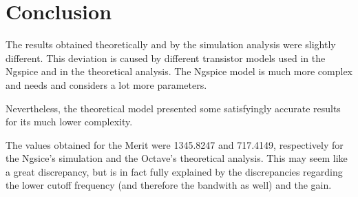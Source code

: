 \section{Conclusion}
\label{sec:conclusion}

The results obtained theoretically and by the simulation analysis were slightly different. This deviation is caused by different transistor models used in the Ngspice and in the theoretical analysis. The Ngspice model is much more complex and needs and considers a lot more parameters.\par
Nevertheless, the theoretical model presented some satisfyingly accurate results for its much lower complexity.\par
The values obtained for the Merit were 1345.8247 and 717.4149, respectively for the Ngsice's simulation and the Octave's theoretical analysis. This may seem like a great discrepancy, but is in fact fully explained by the discrepancies regarding the lower cutoff frequency (and therefore the bandwith as well) and the gain.

